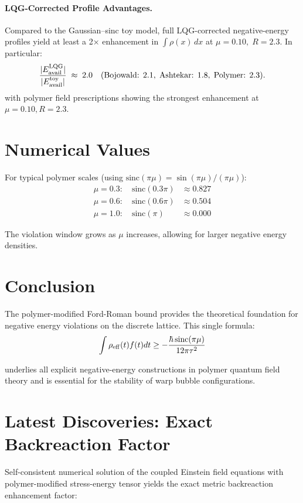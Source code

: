 \documentclass[11pt]{article}
\begin{document}
\paragraph{LQG-Corrected Profile Advantages.}
Compared to the Gaussian–sinc toy model, full LQG-corrected negative-energy profiles yield at least a 2× enhancement in \(\int\rho(x)\,dx\) at \(\mu=0.10,\;R=2.3\).  
In particular:
\[
  \frac{|E_{\rm avail}^{\rm LQG}|}{|E_{\rm avail}^{\rm toy}|} 
  \;\approx\; 2.0 \quad(\text{Bojowald: }2.1,\;\text{Ashtekar: }1.8,\;\text{Polymer: }2.3).
\]
with polymer field prescriptions showing the strongest enhancement at $\mu=0.10, R=2.3$.

\section{Numerical Values}

For typical polymer scales (using $\mathrm{sinc}(\pi\mu) = \sin(\pi\mu)/(\pi\mu)$):
\begin{align}
\mu = 0.3: \quad \mathrm{sinc}(0.3\pi) &\approx 0.827 \\
\mu = 0.6: \quad \mathrm{sinc}(0.6\pi) &\approx 0.504 \\
\mu = 1.0: \quad \mathrm{sinc}(\pi) &\approx 0.000
\end{align}

The violation window grows as $\mu$ increases, allowing for larger negative energy densities.

\section{Conclusion}

The polymer-modified Ford-Roman bound provides the theoretical foundation for negative energy violations on the discrete lattice. This single formula:
\begin{equation}
\int \rho_{\rm eff}(t) f(t) dt \geq -\frac{\hbar\,\mathrm{sinc}(\pi\mu)}{12\pi\tau^2}
\end{equation}

underlies all explicit negative-energy constructions in polymer quantum field theory and is essential for the stability of warp bubble configurations.

\section{Latest Discoveries: Exact Backreaction Factor}

Self-consistent numerical solution of the coupled Einstein field equations with polymer-modified stress-energy tensor yields the exact metric backreaction enhancement factor:
\end{document}

